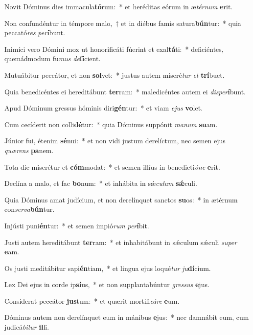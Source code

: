\item Novit Dóminus dies immacula\textbf{tó}rum:~* et heréditas eórum in æ\textit{tér}\textit{num} \textbf{e}rit.
\item Non confundéntur in témpore malo,~† et in diébus famis satura\textbf{bún}tur:~* quia peccató\textit{res} \textit{per}\textbf{í}bunt.
\item Inimíci vero Dómini mox ut honorificáti fúerint et exal\textbf{tá}ti:~* deficiéntes, quemádmodum fu\textit{mus} \textit{de}\textbf{fí}cient.
\item Mutuábitur peccátor, et non \textbf{sol}vet:~* justus autem miseré\textit{tur} \textit{et} \textbf{trí}buet.
\item Quia benedicéntes ei hereditábunt \textbf{ter}ram:~* maledicéntes autem ei \textit{dis}\textit{per}\textbf{í}bunt.
\item Apud Dóminum gressus hóminis diri\textbf{gén}tur:~* et viam \textit{e}\textit{jus} \textbf{vo}let.
\item Cum cecíderit non colli\textbf{dé}tur:~* quia Dóminus suppónit \textit{ma}\textit{num} \textbf{su}am.
\item Júnior fui, étenim \textbf{sé}nui:~* et non vidi justum derelíctum, nec semen ejus \textit{quæ}\textit{rens} \textbf{pa}nem.
\item Tota die miserétur et \textbf{cóm}modat:~* et semen illíus in benedicti\textit{ó}\textit{ne} \textbf{e}rit.
\item Declína a malo, et fac \textbf{bo}num:~* et inhábita in sǽ\textit{cu}\textit{lum} \textbf{sǽ}culi.
\item Quia Dóminus amat judícium, et non derelínquet sanctos \textbf{su}os:~* in ætérnum con\textit{ser}\textit{va}\textbf{bún}tur.
\item Injústi puni\textbf{én}tur:~* et semen impió\textit{rum} \textit{per}\textbf{í}bit.
\item Justi autem hereditábunt \textbf{ter}ram:~* et inhabitábunt in sǽculum sǽculi \textit{su}\textit{per} \textbf{e}am.
\item Os justi meditábitur sapi\textbf{én}tiam,~* et lingua ejus loqué\textit{tur} \textit{ju}\textbf{dí}cium.
\item Lex Dei ejus in corde ip\textbf{sí}us,~* et non supplantabúntur \textit{gres}\textit{sus} \textbf{e}jus.
\item Consíderat peccátor \textbf{jus}tum:~* et quærit mortifi\textit{cá}\textit{re} \textbf{e}um.
\item Dóminus autem non derelínquet eum in mánibus \textbf{e}jus:~* nec damnábit eum, cum judicá\textit{bi}\textit{tur} \textbf{il}li.
